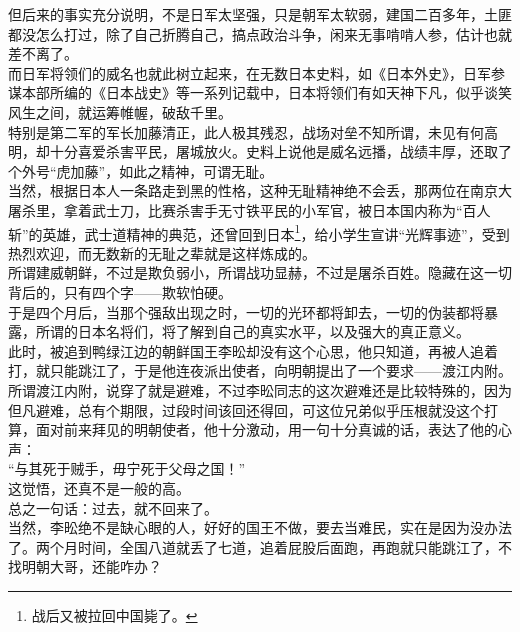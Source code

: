 \begin{multicols}{\theparacolNo}
但后来的事实充分说明，不是日军太坚强，只是朝军太软弱，建国二百多年，土匪都没怎么打过，除了自己折腾自己，搞点政治斗争，闲来无事啃啃人参，估计也就差不离了。\\

而日军将领们的威名也就此树立起来，在无数日本史料，如《日本外史》，日军参谋本部所编的《日本战史》等一系列记载中，日本将领们有如天神下凡，似乎谈笑风生之间，就运筹帷幄，破敌千里。\\

特别是第二军的军长加藤清正，此人极其残忍，战场对垒不知所谓，未见有何高明，却十分喜爱杀害平民，屠城放火。史料上说他是威名远播，战绩丰厚，还取了个外号“虎加藤”，如此之精神，可谓无耻。\\

当然，根据日本人一条路走到黑的性格，这种无耻精神绝不会丢，那两位在南京大屠杀里，拿着武士刀，比赛杀害手无寸铁平民的小军官，被日本国内称为“百人斩”的英雄，武士道精神的典范，还曾回到日本\footnote{战后又被拉回中国毙了。}，给小学生宣讲“光辉事迹”，受到热烈欢迎，而无数新的无耻之辈就是这样炼成的。\\

所谓建威朝鲜，不过是欺负弱小，所谓战功显赫，不过是屠杀百姓。隐藏在这一切背后的，只有四个字——欺软怕硬。\\

于是四个月后，当那个强敌出现之时，一切的光环都将卸去，一切的伪装都将暴露，所谓的日本名将们，将了解到自己的真实水平，以及强大的真正意义。\\

此时，被追到鸭绿江边的朝鲜国王李昖却没有这个心思，他只知道，再被人追着打，就只能跳江了，于是他连夜派出使者，向明朝提出了一个要求——渡江内附。\\

所谓渡江内附，说穿了就是避难，不过李昖同志的这次避难还是比较特殊的，因为但凡避难，总有个期限，过段时间该回还得回，可这位兄弟似乎压根就没这个打算，面对前来拜见的明朝使者，他十分激动，用一句十分真诚的话，表达了他的心声：\\

“与其死于贼手，毋宁死于父母之国！”\\

这觉悟，还真不是一般的高。\\

总之一句话：过去，就不回来了。\\

当然，李昖绝不是缺心眼的人，好好的国王不做，要去当难民，实在是因为没办法了。两个月时间，全国八道就丢了七道，追着屁股后面跑，再跑就只能跳江了，不找明朝大哥，还能咋办？\\


\end{multicols}
